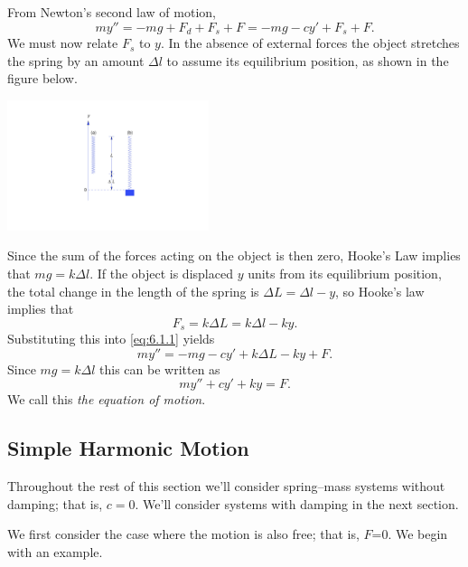 \documentclass{ximera}
\begin{document}
From Newton's second law of motion,
\begin{equation}\label{eq:6.1.1}
my''=-mg+F_d+F_s+F=-mg-cy'+F_s+F.
\end{equation}
We must now relate $F_s$ to $y$. In the absence of external forces the
object stretches the spring by an amount $\Delta l$ to assume its
equilibrium position, as shown in the figure below.

\begin{image}
  \includegraphics[height=1.5in]{fig060103.jpg} 
\end{image}

Since the sum of the forces acting on the object
is then zero, Hooke's Law implies that $mg=k\Delta l$. If the object
is displaced $y$ units from its equilibrium position, the total
change in the length of the spring is $\Delta L=\Delta l-y$,
 so Hooke's law implies that
 $$
F_s=k\Delta L=k\Delta l-ky.
$$
Substituting this into \eqref{eq:6.1.1} yields
$$
my''=-mg-cy'+k\Delta L-ky+F.
$$
Since $mg=k\Delta l$ this can be written as
\begin{equation}\label{eq:6.1.2}
my''+cy'+ky=F.
\end{equation}
We call this \textit{the equation of motion}.


\subsection*{Simple Harmonic Motion}

Throughout the rest of this section we'll consider spring--mass
systems without damping; that is, $c=0$. We'll consider systems with
damping in the next section.

We first consider the case where the motion is also free; that is,
$F$=0. We begin with an example.
\end{document}
